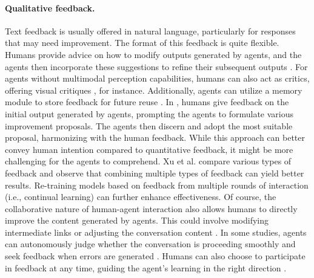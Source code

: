 \paragraph{Qualitative feedback.}
Text feedback is usually offered in natural language, particularly for responses that may need improvement. The format of this feedback is quite flexible. Humans provide advice on how to modify outputs generated by agents, and the agents then incorporate these suggestions to refine their subsequent outputs \cite{DBLP:conf/naacl/MehtaG19, DBLP:conf/naacl/ElgoharyMRFRA21}. For agents without multimodal perception capabilities, humans can also act as critics, offering visual critiques \cite{DBLP:journals/corr/abs-2305-16291}, for instance. Additionally, agents can utilize a memory module to store feedback for future reuse \cite{DBLP:conf/naacl/TandonMCY22}. In \cite{DBLP:journals/corr/abs-2303-16755}, humans give feedback on the initial output generated by agents, prompting the agents to formulate various improvement proposals. The agents then discern and adopt the most suitable proposal, harmonizing with the human feedback. While this approach can better convey human intention compared to quantitative feedback, it might be more challenging for the agents to comprehend. Xu et al. \cite{DBLP:conf/acl/XuUKABW23} compare various types of feedback and observe that combining multiple types of feedback can yield better results. Re-training models based on feedback from multiple rounds of interaction (i.e., continual learning) can further enhance effectiveness. Of course, the collaborative nature of human-agent interaction also allows humans to directly improve the content generated by agents. This could involve modifying intermediate links \cite{DBLP:conf/chi/WuTC22, DBLP:journals/corr/abs-2306-07932} or adjusting the conversation content \cite{DBLP:journals/corr/abs-2307-07047}. In some studies, agents can autonomously judge whether the conversation is proceeding smoothly and seek feedback when errors are generated \cite{DBLP:conf/acl/HancockBMW19, DBLP:journals/corr/abs-2304-10750}. Humans can also choose to participate in feedback at any time, guiding the agent's learning in the right direction \cite{DBLP:conf/iclr/SchickYJPLIYNG023}.


